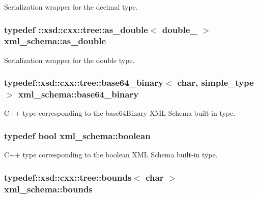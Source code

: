 Serialization wrapper for the decimal type. 

\hypertarget{namespacexml__schema_ae0eab1db5641db3b286a63a0ebe40351}{
\subsubsection[{as\-\_\-double}]{\setlength{\rightskip}{0pt plus 5cm}typedef \-::xsd\-::cxx\-::tree\-::as\-\_\-double$<$ {\bf double\-\_\-} $>$ {\bf xml\-\_\-schema\-::as\-\_\-double}}}\label{namespacexml__schema_ae0eab1db5641db3b286a63a0ebe40351}


Serialization wrapper for the double type. 

\hypertarget{namespacexml__schema_a6a44de5a5883b8a6377178c988a87b93}{
\subsubsection[{base64\-\_\-binary}]{\setlength{\rightskip}{0pt plus 5cm}typedef\-::xsd\-::cxx\-::tree\-::base64\-\_\-binary$<$ char, {\bf simple\-\_\-type} $>$ {\bf xml\-\_\-schema\-::base64\-\_\-binary}}}\label{namespacexml__schema_a6a44de5a5883b8a6377178c988a87b93}


C++ type corresponding to the base64\-Binary X\-M\-L Schema built-\/in type. 

\hypertarget{namespacexml__schema_ae5ada4ec9c54b51765c3e4c0e9631bba}{
\subsubsection[{boolean}]{\setlength{\rightskip}{0pt plus 5cm}typedef bool {\bf xml\-\_\-schema\-::boolean}}}\label{namespacexml__schema_ae5ada4ec9c54b51765c3e4c0e9631bba}


C++ type corresponding to the boolean X\-M\-L Schema built-\/in type. 

\hypertarget{namespacexml__schema_a0130942a2c58fd1fda434722d42ede1d}{
\subsubsection[{bounds}]{\setlength{\rightskip}{0pt plus 5cm}typedef\-::xsd\-::cxx\-::tree\-::bounds$<$ char $>$ {\bf xml\-\_\-schema\-::bounds}}}\label{namespacexml__schema_a0130942a2c58fd1fda434722d42ede1d}


